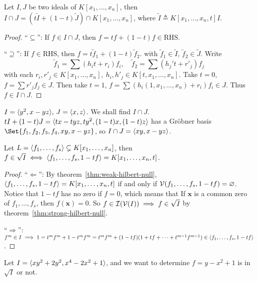 \begin{theorem}
  Let $I, J$ be two ideals of $K[x_1, \dots, x_n]$, then $I \cap J =
  (t \tilde{I} + (1 - t) \tilde{J}) \cap K[x_1, \dots, x_n]$,
  where $\tilde{I} \triangleq K[x_1, \dots, x_n, t] I$.
  \begin{proof}
    ``$\subseteq$'': If $f \in I \cap J$, then $f = tf + (1-t)f \in \text{RHS}$.

    ``$\supseteq$'': If $f \in \text{RHS}$, then $f = t \tilde{f}_1 + (1-t) \tilde{f}_2$.
    with $\tilde{f}_1 \in \tilde{I}$, $\tilde{f}_2 \in \tilde{J}$.
    Write
    \[ \tilde{f}_1 = \sum (h_i t + r_i) f_i, \quad
      \tilde{f}_2 = \sum (h_j' t + r'_j) f_j \]
    with each $r_i, r'_j \in K[x_1, \dots, x_n], \ h_i, h'_j \in K[t, x_1, \dots, x_n] $.
    Take $t = 0$, $f = \sum r'_j f_j \in J$. Then take $t = 1$,
    $f = \sum (h_i(1, x_1, \dots, x_n) + r_i) f_i \in J$. Thus $f \in I \cap J$.
  \end{proof}
\end{theorem}

\begin{example}
  $I = \langle y^2 , x - yz \rangle, \, J = \langle x, z \rangle$. We shall find $I \cap J$. \\
  $tI + (1-t)J = \langle tx - tyz, ty^2, (1-t)x, (1-t)z \rangle$ has a Gr\"obner basis
  $\Set{f_1, f_2, f_3, f_4, xy, x - yz}$, so $I \cap J = \langle xy, x-yz \rangle$.
\end{example}

\begin{theorem}
  Let $L = \langle f_1, \dots, f_s \rangle \subsetneq K[x_1, \dots, x_n]$, then
  $f \in \sqrt{I} \iff \langle f_1, \dots, f_s, 1 - tf \rangle = K[x_1, \dots, x_n, t]$.
  \begin{proof}
    ``$\Leftarrow$'': By theorem~\ref{thm:weak-hilbert-null},
    $\langle f_1, \dots, f_s, 1-tf\rangle = K[x_1, \dots, x_n, t]$ if and only if
    $\mathcal{V}(f_1, \dots, f_s, 1-tf) = \varnothing$. Notice that $1-tf$
    has no zero if $f = 0$, which means that
    If $\bm{x}$ is a common zero of $f_1, \dots, f_s$, then
    $f(\bm{x}) = 0$. So $f \in \mathcal{I}(\mathcal{V}(I)) \implies f \in \sqrt{I}$
    by theorem~\ref{thm:strong-hilbert-null}.

    ``$\Rightarrow$'': $f^m \in I \implies 1 = t^mf^m + 1 - t^m f^m
    = t^m f^m + (1-tf)(1 + tf + \dots + t^{m-1} f^{m-1}) \in \langle f_1, \dots, f_s, 1-tf\rangle$.
  \end{proof}
\end{theorem}

\begin{example}
  Let $I = \langle xy^2 + 2y^2, x^4 - 2x^2 + 1 \rangle$, and we want to determine
  $f = y - x^2 + 1$ is in $\sqrt{I}$ or not.
\end{example}

